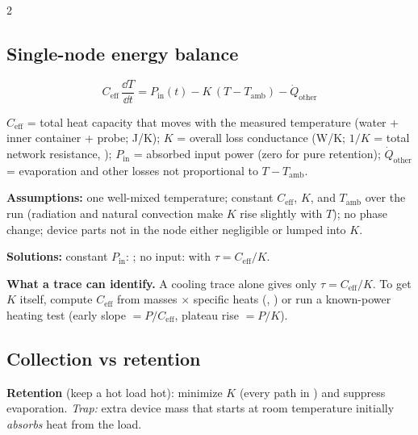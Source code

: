 \begin{multicols}{2}
\subsection{Single-node energy balance}\label{sec:devicemodel}
\CORE{}
\begin{formulabox}
\begin{equation}
C_{\text{eff}}\,\frac{\dd T}{\dd t}=P_{\text{in}}(t)-K\,(T-T_{\text{amb}})-\dot Q_{\text{other}} \label{F:device:balance}
\end{equation}
\end{formulabox}
$C_{\text{eff}}$ = total heat capacity that moves with the measured temperature (water + inner container + probe; \si{J/K}); $K$ = overall loss conductance (\si{W/K}; $1/K$ = total network resistance, ); $P_{\text{in}}$ = absorbed input power (zero for pure retention); $\dot Q_{\text{other}}$ = evaporation and other losses not proportional to $T-T_{\text{amb}}$.

\textbf{Assumptions:} one well-mixed temperature; constant $C_{\text{eff}}$, $K$, and $T_{\text{amb}}$ over the run (radiation and natural convection make $K$ rise slightly with $T$); no phase change; device parts not in the node either negligible or lumped into $K$.

\textbf{Solutions:} constant $P_{\text{in}}$: ; no input:  with $\tau=C_{\text{eff}}/K$.

\begin{keybox}\textbf{What a trace can identify.} A cooling trace alone gives only $\tau=C_{\text{eff}}/K$. To get $K$ itself, compute $C_{\text{eff}}$ from masses $\times$ specific heats (, ) or run a known-power heating test (early slope $=P/C_{\text{eff}}$, plateau rise $=P/K$).\end{keybox}

\subsection{Collection vs retention}\label{sec:collectretain}
\textbf{Retention} (keep a hot load hot): minimize $K$ (every path in ) and suppress evaporation. \emph{Trap:} extra device mass that starts at room temperature initially \emph{absorbs} heat from the load.


\end{multicols}
